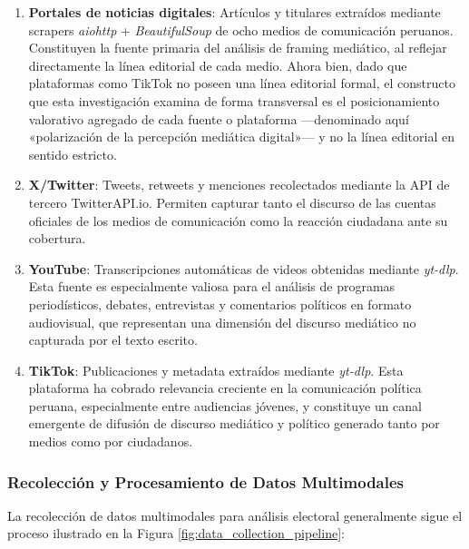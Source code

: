 \begin{enumerate}
    \item \textbf{Portales de noticias digitales}: Artículos y titulares extraídos mediante scrapers \textit{aiohttp} + \textit{BeautifulSoup} de ocho medios de comunicación peruanos. Constituyen la fuente primaria del análisis de framing mediático, al reflejar directamente la línea editorial de cada medio. Ahora bien, dado que plataformas como TikTok no poseen una línea editorial formal, el constructo que esta investigación examina de forma transversal es el posicionamiento valorativo agregado de cada fuente o plataforma —denominado aquí «polarización de la percepción mediática digital»— y no la línea editorial en sentido estricto.

    \item \textbf{X/Twitter}: Tweets, retweets y menciones recolectados mediante la API de tercero TwitterAPI.io. Permiten capturar tanto el discurso de las cuentas oficiales de los medios de comunicación como la reacción ciudadana ante su cobertura.

    \item \textbf{YouTube}: Transcripciones automáticas de videos obtenidas mediante \textit{yt-dlp}. Esta fuente es especialmente valiosa para el análisis de programas periodísticos, debates, entrevistas y comentarios políticos en formato audiovisual, que representan una dimensión del discurso mediático no capturada por el texto escrito.

    \item \textbf{TikTok}: Publicaciones y metadata extraídos mediante \textit{yt-dlp}. Esta plataforma ha cobrado relevancia creciente en la comunicación política peruana, especialmente entre audiencias jóvenes, y constituye un canal emergente de difusión de discurso mediático y político generado tanto por medios como por ciudadanos.
\end{enumerate}

\subsubsection{Recolección y Procesamiento de Datos Multimodales}

La recolección de datos multimodales para análisis electoral generalmente sigue el proceso ilustrado en la Figura \ref{fig:data_collection_pipeline}:

